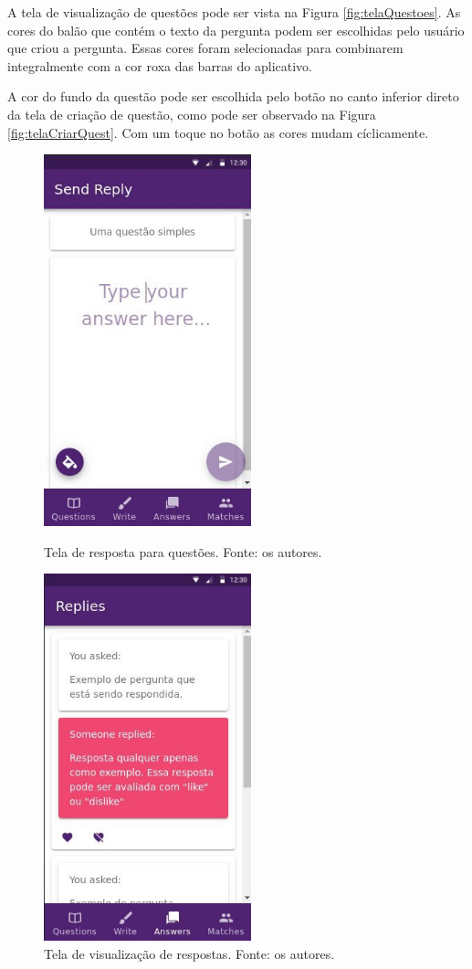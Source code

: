 A tela de visualização de questões pode ser vista na Figura \ref{fig:telaQuestoes}. As cores do balão que contém o texto da pergunta podem ser escolhidas pelo usuário que criou a pergunta. Essas cores foram selecionadas para combinarem integralmente com a cor roxa das barras do aplicativo.

A cor do fundo da questão pode ser escolhida pelo botão no canto inferior direto da tela de criação de questão, como pode ser observado na Figura \ref{fig:telaCriarQuest}. Com um toque no botão as cores mudam cíclicamente.

\begin{figure}
\begin{minipage}{0.45\textwidth}
\centering
\includegraphics[width=6cm]{telaResponder.png}
\caption{Tela de resposta para questões. Fonte: os autores.}
\label{fig:telaResponder}
\end{minipage}\hfill
\begin{minipage}{0.45\textwidth}
\centering
\includegraphics[width=6cm]{telaVerResp.png}
\caption{Tela de visualização de respostas. Fonte: os autores.}
\label{fig:telaVerResp}
\end{minipage}\hfill
\end{figure}

